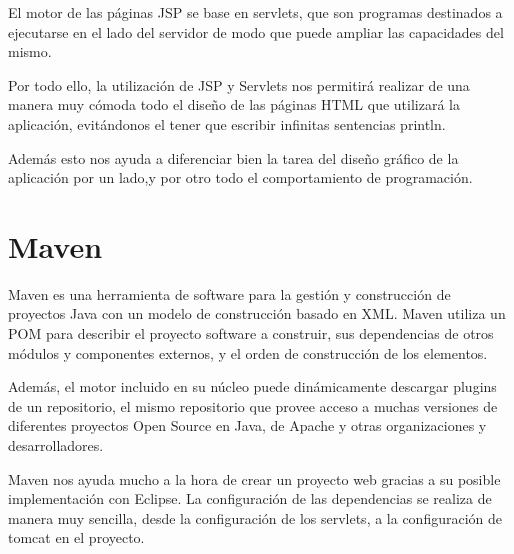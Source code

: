 El motor de las páginas JSP se base en servlets, que son programas destinados a ejecutarse en el lado del servidor de modo que puede ampliar las capacidades del mismo.

Por todo ello, la utilización de JSP y Servlets nos permitirá realizar de una manera muy cómoda todo el diseño de las páginas HTML que utilizará la aplicación, evitándonos el tener que escribir infinitas sentencias println. 

Además esto nos ayuda a diferenciar bien la tarea del diseño gráfico de la aplicación por un lado,y por otro todo el comportamiento de programación.

\section{Maven} 

Maven es una herramienta de software para la gestión y construcción de proyectos Java con un modelo de construcción basado en XML. Maven utiliza un POM para describir el proyecto software a construir, sus dependencias de otros módulos y componentes externos, y el orden de construcción de los elementos. 

Además, el motor incluido en su núcleo puede dinámicamente descargar plugins de un repositorio, el mismo repositorio que provee acceso a muchas versiones de diferentes proyectos Open Source en Java, de Apache y otras organizaciones y desarrolladores. \cite{wiki:maven}

Maven nos ayuda mucho a la hora de crear un proyecto web gracias a su posible implementación con Eclipse. La configuración de las dependencias se realiza de manera muy sencilla, desde la configuración de los servlets, a la configuración de tomcat en el proyecto.

